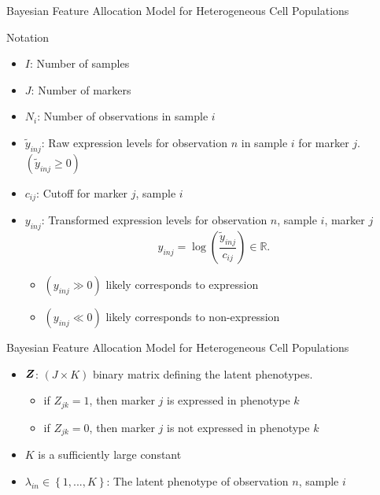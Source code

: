 \documentclass[ignorenonframetext,]{beamer}
\providecommand{\tightlist}{%
  \setlength{\itemsep}{0pt}\setlength{\parskip}{0pt}}
\newcommand{\p}[1]{\left(#1\right)}
\newcommand{\bc}[1]{ \left\{#1\right\} }
\newcommand{\bZ}{\mbox{\boldmath $Z$}}
\begin{document}
\begin{frame}{Bayesian Feature Allocation Model for
Heterogeneous Cell Populations}

\begin{block}{Notation}

\begin{itemize}
\tightlist
\item
  \(I\): Number of samples
\item
  \(J\): Number of markers
\item
  \(N_i\): Number of observations in sample \(i\)
\item
  \(\tilde{y}_{inj}\): Raw expression levels for observation \(n\) in
  sample \(i\) for marker \(j\). \((\tilde y_{inj} \ge 0)\)
\item
  \(c_{ij}\): Cutoff for marker \(j\), sample \(i\)
\item
  \(y_{inj}\): Transformed expression levels for observation \(n\),
  sample \(i\), marker \(j\) \[
  y_{inj}=\log\p{\frac{\tilde{y}_{inj}}{c_{ij}}} \in \mathbb{R}.
  \]

  \begin{itemize}
  \tightlist
  \item
    \((y_{inj} \gg 0)\) likely corresponds to expression
  \item
    \((y_{inj} \ll 0)\) likely corresponds to non-expression
  \end{itemize}
\end{itemize}

\end{block}

\end{frame}

\begin{frame}{Bayesian Feature Allocation Model for
Heterogeneous Cell Populations}

\begin{itemize}
\item
  \(\bZ\): \((J \times K)\) binary matrix defining the latent
  phenotypes.

  \begin{itemize}
  \item
    if \(Z_{jk} = 1\), then marker \(j\) is expressed in phenotype \(k\)
  \item
    if \(Z_{jk} = 0\), then marker \(j\) is not expressed in phenotype
    \(k\)
  \end{itemize}
\item $K$ is a sufficiently large constant
\item
  \(\lambda_{in} \in \bc{1,...,K}\): The latent phenotype of observation
  \(n\), sample \(i\)
\end{itemize}
\end{frame}
\end{document}
